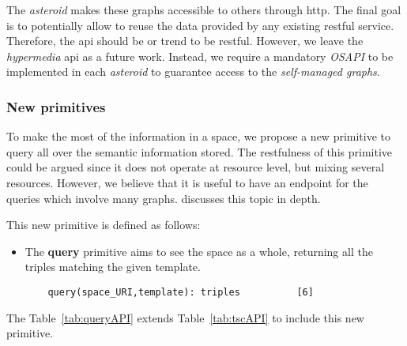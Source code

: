 The \emph{asteroid} makes these graphs accessible to others through \ac{http}.
The final goal is to potentially allow to reuse the data provided by any existing \ac{rest}ful service. %
Therefore, the \ac{api} should be or trend to be \ac{rest}ful.
However, we leave the \emph{hypermedia} \ac{api} as a future work.
Instead, we require a mandatory \emph{OSAPI} to be implemented in each \emph{asteroid} to guarantee access to the \emph{self-managed graphs}.



\subsubsection{New primitives}

To make the most of the information in a space, we propose a new primitive to query all over the semantic information stored.
The \ac{rest}fulness of this primitive could be argued since it does not operate at resource level, but mixing several resources.
However, we believe that it is useful to have an endpoint for the queries which involve many graphs.
\citet{kjernsmo_necessity_2012} discusses this topic in depth. %

This new primitive is defined as follows:
\begin{itemize}
  \item The \textbf{query} primitive aims to see the space as a whole, returning all the triples matching the given template.
  
  \begin{lstlisting}
    query(space_URI,template): triples          [6]
  \end{lstlisting}
\end{itemize}


The Table~\ref{tab:queryAPI} extends Table~\ref{tab:tscAPI} to include this new primitive.

